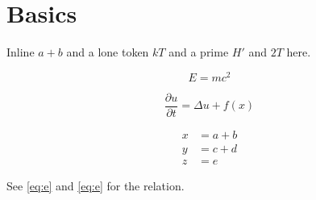 \documentclass{article}
\begin{document}
\section{Basics}

Inline $a+b$ and a lone token $kT$ and a prime $H'$ and $2T$ here.

\begin{equation}
E = mc^{2}
\label{eq:e}
\end{equation}

\begin{equation}
\frac{\partial u}{\partial t} = \Delta u + f(x)
\end{equation}

\begin{align}
x &= a + b \\
y &= c + d \nonumber \\
z &= e
\end{align}

See \eqref{eq:e} and \ref{eq:e} for the relation.
\end{document}
